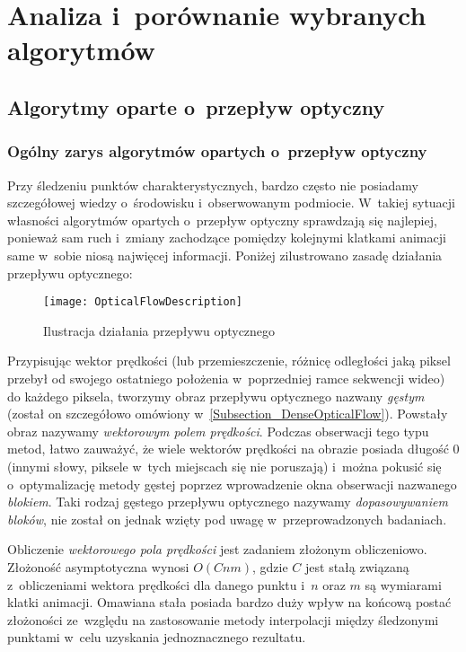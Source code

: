 \chapter{Analiza i~porównanie wybranych algorytmów}\label{Section_Algorytmy}

  \section{Algorytmy oparte o~przepływ optyczny}\label{Subsection_OpticalFlow}

    \subsection{Ogólny zarys algorytmów opartych o~przepływ optyczny}
    Przy śledzeniu punktów charakterystycznych, bardzo często nie posiadamy szczegółowej wiedzy o~środowisku i~obserwowanym podmiocie. W~takiej sytuacji własności algorytmów opartych o~przepływ optyczny sprawdzają się najlepiej, ponieważ sam ruch i~zmiany zachodzące pomiędzy kolejnymi klatkami animacji same w~sobie niosą najwięcej informacji\cite{OpticalFlowNonPriori05}. Poniżej zilustrowano zasadę działania przepływu optycznego:

    \begin{figure}[!ht]
      \centering
      \texttt{[image: OpticalFlowDescription]}
      \caption[Ilustracja działania przepływu optycznego]{Ilustracja działania przepływu optycznego}
      \label{fig:OpticalFlowDescription}
    \end{figure}

    Przypisując wektor prędkości (lub przemieszczenie, różnicę odległości jaką piksel przebył od swojego ostatniego położenia w~poprzedniej ramce sekwencji wideo) do każdego piksela, tworzymy obraz przepływu optycznego nazwany \textit{gęstym} (został on szczegółowo omówiony w~\ref{Subsection_DenseOpticalFlow}). Powstały obraz nazywamy \textit{wektorowym polem prędkości}. Podczas obserwacji tego typu metod, łatwo zauważyć, że wiele wektorów prędkości na obrazie posiada długość $0$ (innymi słowy, piksele w~tych miejscach się nie poruszają) i~można pokusić się o~optymalizację metody gęstej poprzez wprowadzenie okna obserwacji nazwanego \textit{blokiem}. Taki rodzaj gęstego przepływu optycznego nazywamy \textit{dopasowywaniem bloków}, nie został on jednak wzięty pod uwagę w~przeprowadzonych badaniach.

    Obliczenie \textit{wektorowego pola prędkości} jest zadaniem złożonym obliczeniowo. Złożoność asymptotyczna wynosi $O(Cnm)$, gdzie $C$ jest stałą związaną z~obliczeniami wektora prędkości dla danego punktu i~$n$ oraz $m$ są wymiarami klatki animacji. Omawiana stała posiada bardzo duży wpływ na końcową postać złożoności ze~względu na zastosowanie metody interpolacji między śledzonymi punktami w~celu uzyskania jednoznacznego rezultatu.

